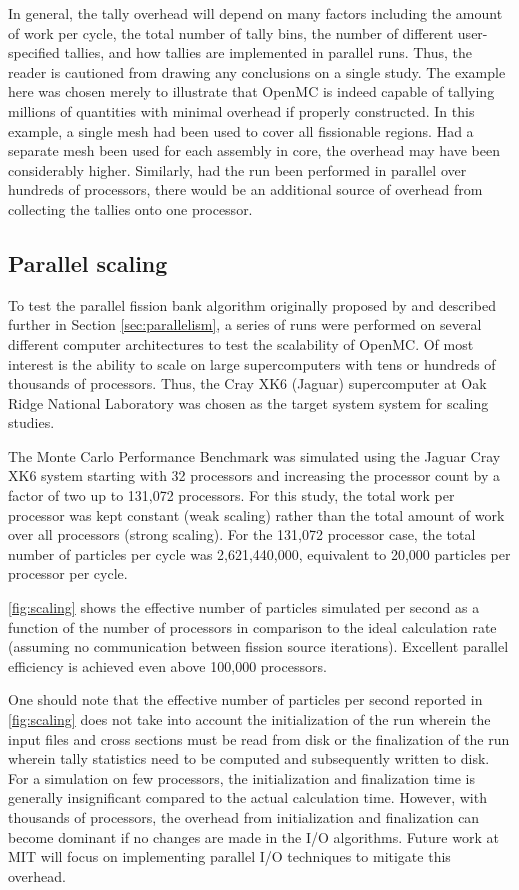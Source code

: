 \documentclass[authoryear,preprint]{elsarticle}
\begin{document}
In general, the tally overhead will depend on many factors including the amount
of work per cycle, the total number of tally bins, the number of different
user-specified tallies, and how tallies are implemented in parallel runs. Thus,
the reader is cautioned from drawing any conclusions on a single study. The
example here was chosen merely to illustrate that OpenMC is indeed capable of
tallying millions of quantities with minimal overhead if properly
constructed. In this example, a single mesh had been used to cover all
fissionable regions. Had a separate mesh been used for each assembly in core,
the overhead may have been considerably higher. Similarly, had the run been
performed in parallel over hundreds of processors, there would be an additional
source of overhead from collecting the tallies onto one processor.

\subsection{Parallel scaling}

To test the parallel fission bank algorithm originally proposed by
\citet{fissionbank} and described further in Section \ref{sec:parallelism}, a
series of runs were performed on several different computer architectures to
test the scalability of OpenMC. Of most interest is the ability to scale on
large supercomputers with tens or hundreds of thousands of processors. Thus, the
Cray XK6 (Jaguar) supercomputer at Oak Ridge National Laboratory \citep{jaguar}
was chosen as the target system system for scaling studies.

The Monte Carlo Performance Benchmark was simulated using the Jaguar Cray XK6
system starting with 32 processors and increasing the processor count by a
factor of two up to 131,072 processors. For this study, the total work per
processor was kept constant (weak scaling) rather than the total amount of work
over all processors (strong scaling). For the 131,072 processor case, the total
number of particles per cycle was 2,621,440,000, equivalent to 20,000 particles
per processor per cycle.

\autoref{fig:scaling} shows the effective number of particles simulated per
second as a function of the number of processors in comparison to the ideal
calculation rate (assuming no communication between fission source
iterations). Excellent parallel efficiency is achieved even above 100,000
processors.

One should note that the effective number of particles per second reported in
\autoref{fig:scaling} does not take into account the initialization of the run
wherein the input files and cross sections must be read from disk or the
finalization of the run wherein tally statistics need to be computed and
subsequently written to disk. For a simulation on few processors, the
initialization and finalization time is generally insignificant compared to the
actual calculation time. However, with thousands of processors, the overhead
from initialization and finalization can become dominant if no changes are made
in the I/O algorithms. Future work at MIT will focus on implementing parallel
I/O techniques to mitigate this overhead.
\end{document}
